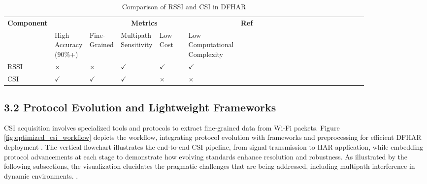 \documentclass[Afour,sageh,times]{sagej}
\begin{document}
\begin{table}[htbp]
\centering
\footnotesize
\caption{Comparison of RSSI and CSI in DFHAR}
\label{tab:rssi_csi_comparison}
\begin{tabularx}{\linewidth}{@{} m{0.1\linewidth} *{5}{m{0.08\linewidth}} m{0.35\linewidth} @{}}
\toprule
\textbf{Component} & \multicolumn{5}{c}{\textbf{Metrics}} & \textbf{Ref} \\
\cline{2-6}
  & High Accuracy (90\%+) & Fine-Grained  & Multipath Sensitivity & Low Cost  & Low Computational Complexity &  \\
\midrule
\rowcolor{lightgray} RSSI & $\times$ & $\times$ & $\checkmark$ & $\checkmark$ & $\checkmark$ & \citep{bahl2000radar, feng2010compressive, moussa2009smart, wilson2010radio, wang2016rt, guo2019robust, hsieh2019deep}  \\
CSI & $\checkmark$ & $\checkmark$ & $\checkmark$ & $\times$ & $\times$ & \citep{wang2016rt, xie2015precise, halperin2011tool, wu2017devicefree, zhou2022target, damodaran2020device, ma2018signfi, zhuo2017perceiving, shi2018accurate}  \\
\bottomrule
\end{tabularx}
\end{table}

\subsection{3.2 Protocol Evolution and Lightweight Frameworks}

CSI acquisition involves specialized tools and protocols to extract fine-grained data from Wi-Fi packets. Figure \ref{fig:optimized_csi_workflow} depicts the workflow, integrating protocol evolution with frameworks and preprocessing for efficient DFHAR deployment \citep{gringoli2019free, yang2022autofi, ding2020wihi}. The vertical flowchart illustrates the end-to-end CSI pipeline, from signal transmission to HAR application, while embedding protocol advancements at each stage to demonstrate how evolving standards enhance resolution and robustness. As illustrated by the following subsections, the visualization elucidates the pragmatic challenges that are being addressed, including multipath interference in dynamic environments.
\citep{guo2019robust, moshiri2020using}.
\end{document}
